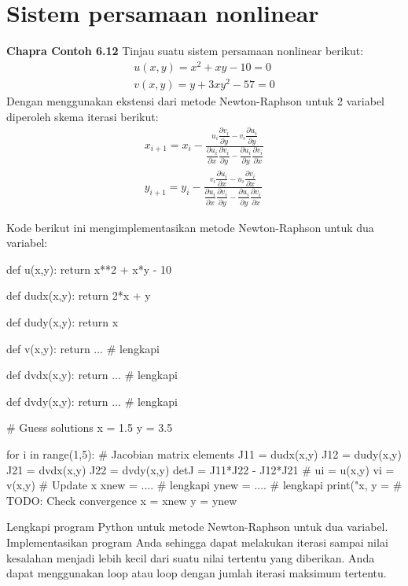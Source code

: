 \section{Sistem persamaan nonlinear}

\textbf{Chapra Contoh 6.12}
Tinjau suatu sistem persamaan nonlinear berikut:
\begin{align*}
u(x,y) = x^{2} + xy - 10 = 0 \\
v(x,y) = y + 3xy^{2} - 57 = 0
\end{align*}
Dengan menggunakan ekstensi dari metode Newton-Raphson untuk 2 variabel
diperoleh skema iterasi berikut:
\begin{align}
x_{i+1} = x_{i} - \frac{
u_{i}\dfrac{\partial v_{i}}{\partial y} - 
v_{i}\dfrac{\partial u_{i}}{\partial y}
}%
{\dfrac{\partial u_{i}}{\partial x}\dfrac{\partial v_{i}}{\partial y} -
 \dfrac{\partial u_{i}}{\partial y}\dfrac{\partial v_{i}}{\partial x} } \\
y_{i+1} = y_{i} - \frac{
v_{i}\dfrac{\partial u_{i}}{\partial x} - 
u_{i}\dfrac{\partial v_{i}}{\partial x}
}%
{\dfrac{\partial u_{i}}{\partial x}\dfrac{\partial v_{i}}{\partial y} -
 \dfrac{\partial u_{i}}{\partial y}\dfrac{\partial v_{i}}{\partial x} }
\end{align}

Kode berikut ini mengimplementasikan metode Newton-Raphson untuk dua variabel:
\begin{pythoncode}
def u(x,y):
    return x**2 + x*y - 10

def dudx(x,y):
    return 2*x + y

def dudy(x,y):
    return x

def v(x,y):
    return ... # lengkapi

def dvdx(x,y):
    return ... # lengkapi

def dvdy(x,y):
    return ... # lengkapi

# Guess solutions
x = 1.5
y = 3.5

for i in range(1,5):
    # Jacobian matrix elements
    J11 = dudx(x,y)
    J12 = dudy(x,y)
    J21 = dvdx(x,y)
    J22 = dvdy(x,y)
    detJ = J11*J22 - J12*J21
    #
    ui = u(x,y)
    vi = v(x,y)
    # Update x
    xnew = .... # lengkapi
    ynew = .... # lengkapi
    print("x, y = %
    # TODO: Check convergence
    x = xnew
    y = ynew
\end{pythoncode}

\begin{soal}
Lengkapi program Python untuk metode Newton-Raphson untuk dua variabel.
Implementasikan program Anda sehingga
dapat melakukan iterasi sampai nilai kesalahan menjadi lebih kecil dari
suatu nilai tertentu yang diberikan. Anda dapat menggunakan loop 
atau loop  dengan jumlah iterasi maksimum tertentu.
\end{soal}

